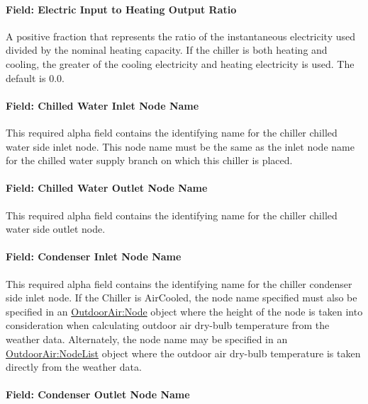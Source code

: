\paragraph{Field: Electric Input to Heating Output Ratio}\label{field-electric-input-to-heating-output-ratio-1}

A positive fraction that represents the ratio of the instantaneous electricity used divided by the nominal heating capacity. If the chiller is both heating and cooling, the greater of the cooling electricity and heating electricity is used. The default is 0.0.

\paragraph{Field: Chilled Water Inlet Node Name}\label{field-chilled-water-inlet-node-name-8}

This required alpha field contains the identifying name for the chiller chilled water side inlet node. This node name must be the same as the inlet node name for the chilled water supply branch on which this chiller is placed.

\paragraph{Field: Chilled Water Outlet Node Name}\label{field-chilled-water-outlet-node-name-9}

This required alpha field contains the identifying name for the chiller chilled water side outlet node.

\paragraph{Field: Condenser Inlet Node Name}\label{field-condenser-inlet-node-name-8}

This required alpha field contains the identifying name for the chiller condenser side inlet node. If the Chiller is AirCooled, the node name specified must also be specified in an \hyperref[outdoorairnode]{OutdoorAir:Node} object where the height of the node is taken into consideration when calculating outdoor air dry-bulb temperature from the weather data. Alternately, the node name may be specified in an \hyperref[outdoorairnodelist]{OutdoorAir:NodeList} object where the outdoor air dry-bulb temperature is taken directly from the weather data.

\paragraph{Field: Condenser Outlet Node Name}\label{field-condenser-outlet-node-name-8}

